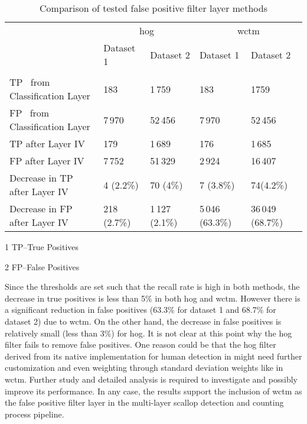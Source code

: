 \begin{table*}
  \centering
  \begin{threeparttable}
    \begin{tabular}{lllll}
\toprule[1pt]
	&\multicolumn{2}{c}{\gls{hog}}	&\multicolumn{2}{c}{\gls{wctm}}\\
	&Dataset 1	&Dataset 2	&Dataset 1	&Dataset 2\\ [2pt]\cline{1-5}\\[-5pt]
TP\tnote{1} ~from Classification Layer	&183		&1\,759		&183		&1759\\
FP\tnote{2} ~from Classification Layer	&7\,970		&52\,456		&7\,970		&52\,456\\
TP after Layer IV 			&179		&1\,689		&176		&1\,685\\
FP after Layer IV 			&7\,752		&51\,329		&2\,924		&16\,407\\
Decrease in TP after Layer IV	&4 (2.2\%)	&70 (4\%)	&7 (3.8\%)	&74(4.2\%)\\
Decrease in FP after Layer IV	&218 (2.7\%)	&1\,127 (2.1\%)	&5\,046 (63.3\%)	&36\,049 (68.7\%)\\ \bottomrule
    \end{tabular}
    \begin{tablenotes}
	  \item[1] \footnotesize{TP--True Positives}
	  \item[2] \footnotesize{FP--False Positives}
    \end{tablenotes}                                                      
  \end{threeparttable}
  \caption{Comparison of tested false positive filter layer methods}
  \label{tab:false_positives}
\end{table*}      
%
Since the thresholds are set such that the recall rate is high in both methods, the decrease in true positives is less than 5\% in both \gls{hog} and \gls{wctm}. 
However there is a significant reduction in false positives (63.3\% for dataset 1 and 68.7\% for dataset 2)  due to \gls{wctm}. 
On the other hand, the decrease in false positives is relatively small (less than 3\%) for \gls{hog}.
It is not clear at this point why the \gls{hog} filter fails to remove  false positives. 
One reason could be that the \gls{hog} filter derived from its native implementation for human detection in \cite{dalal} might need further customization and even weighting through standard deviation weights like in \gls{wctm}. 
Further study and detailed analysis is required to investigate and possibly improve its performance. 
In any case, the results support the inclusion of \gls{wctm} as the false positive filter layer in the multi-layer scallop detection and counting process pipeline.

